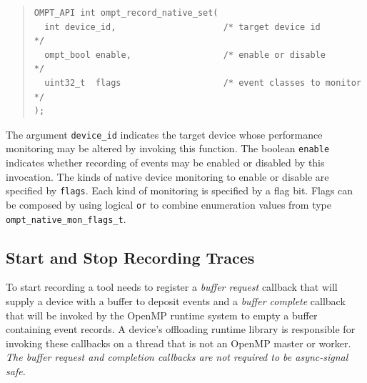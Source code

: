 \documentclass{article}
\begin{document}
\begin{quote}
\begin{verbatim}
OMPT_API int ompt_record_native_set(
  int device_id,                     /* target device id                */
  ompt_bool enable,                  /* enable or disable               */
  uint32_t  flags                    /* event classes to monitor        */
);
\end{verbatim}
\end{quote}
The argument \verb|device_id| indicates the target device whose performance monitoring may be altered by invoking this function. The boolean \verb|enable| indicates whether recording of events may be enabled or disabled by this invocation.
The kinds of native device monitoring to enable or disable are specified by \verb|flags|. Each kind of monitoring is specified by a flag bit. Flags can be composed by using logical {\tt or}  to combine enumeration values from type \verb|ompt_native_mon_flags_t|.


\subsection{Start and Stop Recording Traces}
\label{sec:start-stop-recording}

To start recording a tool needs to register a \emph{buffer request} callback that will supply a device with a buffer to deposit events and a \emph{buffer complete} callback that will be invoked by the OpenMP runtime system to empty a buffer containing event records. A device's offloading runtime library is responsible for invoking these callbacks on a thread that is not an OpenMP master or worker. {\em The buffer request and completion callbacks are not required to  be async-signal safe.}
\end{document}
